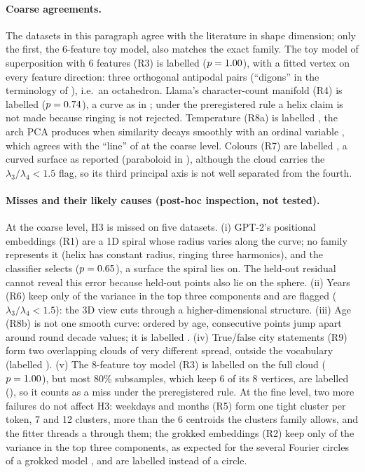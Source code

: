 \paragraph{Coarse agreements.} The datasets in this paragraph agree with the literature in shape dimension; only the first, the 6-feature toy model, also matches the exact family. The toy model of superposition with 6 features (R3) is labelled \fitRthreetmsnsix{} ($p=1.00{}$), with a fitted vertex on every feature direction: three orthogonal antipodal pairs (``digons'' in the terminology of \citealp{elhage2022tms}), i.e.\ an octahedron. Llama's character-count manifold (R4) is labelled \fitRfourllamacounting{} ($p=0.74{}$), a curve as in \citet{gurnee2025linebreaks}; under the preregistered rule a helix claim is not made because ringing is not rejected. Temperature (R8a) is labelled \fitReightallamatemperature{}, the arch PCA produces when similarity decays smoothly with an ordinal variable \citep{novembre2008horseshoe,antognini2018walks}, which agrees with the ``line'' of \citet{bhalla2026sae} at the coarse level. Colours (R7) are labelled \fitRsevenllamacolors{}, a curved surface as reported (paraboloid in \citealp{bhalla2026sae}), although the cloud carries the $\lambda_3/\lambda_4<1.5$ flag, so its third principal axis is not well separated from the fourth.

\paragraph{Misses and their likely causes (post-hoc inspection, not tested).} At the coarse level, H3 is missed on five datasets. (i) GPT-2's positional embeddings (R1) are a 1D spiral whose radius varies along the curve; no family represents it (helix has constant radius, ringing three harmonics), and the classifier selects \fitRonegpttwowpos{} ($p=0.65{}$), a surface the spiral lies on. The held-out residual cannot reveal this error because held-out points also lie on the sphere. (ii) Years (R6) keep only \varRsixllamayears{} of the variance in the top three components and are flagged ($\lambda_3/\lambda_4<1.5$): the 3D view cuts through a higher-dimensional structure. (iii) Age (R8b) is not one smooth curve: ordered by age, consecutive points jump apart around round decade values; it is labelled \fitReightbllamaage{}. (iv) True/false city statements (R9) form two overlapping clouds of very different spread, outside the vocabulary (labelled \fitRninellamatruthcities{}). (v) The 8-feature toy model (R3) is labelled \fitRthreetmsneight{} on the full cloud ($p=1.00{}$), but most 80\% subsamples, which keep 6 of its 8 vertices, are labelled \majRthreetmsneight{} (\majfreqRthreetmsneight{}), so it counts as a miss under the preregistered rule. At the fine level, two more failures do not affect H3: weekdays and months (R5) form one tight cluster per token, 7 and 12 clusters, more than the 6 centroids the clusters family allows, and the fitter threads a \fitRfiveallamaweekdays{} through them; the grokked embeddings (R2) keep only \varRtwogrokkingWE{} of the variance in the top three components, as expected for the several Fourier circles of a grokked model \citep{nanda2023progress}, and are labelled \fitRtwogrokkingWE{} instead of a circle.

